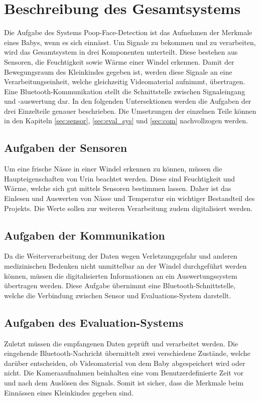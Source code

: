 \section{Beschreibung des Gesamtsystems}
\label{sec:Gesamtsystem}

Die Aufgabe des Systems Poop-Face-Detection ist das Aufnehmen der Merkmale eines Babys, wenn es sich einnässt. Um Signale zu bekommen und zu verarbeiten, wird das Gesamtsystem in drei Komponenten unterteilt. Diese bestehen aus Sensoren, die Feuchtigkeit sowie Wärme einer Windel erkennen. Damit der Bewegungsraum des Kleinkindes gegeben ist, werden diese Signale an eine Verarbeitungseinheit, welche gleichzeitig Videomaterial aufnimmt, übertragen. Eine Bluetooth-Kommunikation stellt die Schnittstelle zwischen Signaleingang und -auswertung dar. In den folgenden Untersektionen werden die Aufgaben der drei Einzelteile genauer beschrieben. Die Umsetzungen der einzelnen Teile können in den Kapiteln \ref{sec:sensor}, \ref{sec:eval_sys}  und \ref{sec:com} nachvollzogen werden.

\subsection{Aufgaben der Sensoren}

Um eine frische Nässe in einer Windel erkennen zu können, müssen die Haupteigenschaften von Urin beachtet werden. Diese sind Feuchtigkeit und Wärme, welche sich gut mittels Sensoren bestimmen lassen. Daher ist das Einlesen und Auswerten von Nässe und Temperatur ein wichtiger Bestandteil des Projekts. Die Werte sollen zur weiteren Verarbeitung zudem digitalisiert werden.

\subsection{Aufgaben der Kommunikation}

Da die Weiterverarbeitung der Daten wegen Verletzungsgefahr und anderen medizinischen Bedenken nicht unmittelbar an der Windel durchgeführt werden können, müssen die digitalisierten Informationen an ein Auswertungssystem übertragen werden. Diese Aufgabe übernimmt eine Bluetooth-Schnittstelle, welche die Verbindung zwischen Sensor und Evaluations-System darstellt.

\subsection{Aufgaben des Evaluation-Systems}

Zuletzt müssen die empfangenen Daten geprüft und verarbeitet werden. Die eingehende Bluetooth-Nachricht übermittelt zwei verschiedene Zustände, welche darüber entscheiden, ob Videomaterial von dem Baby abgespeichert wird oder nicht. Die Kameraaufnahmen beinhalten eine vom Benutzerdefinierte Zeit vor und nach dem Auslösen des Signals. Somit ist sicher, dass die Merkmale beim Einnässen eines Kleinkindes gegeben sind.




